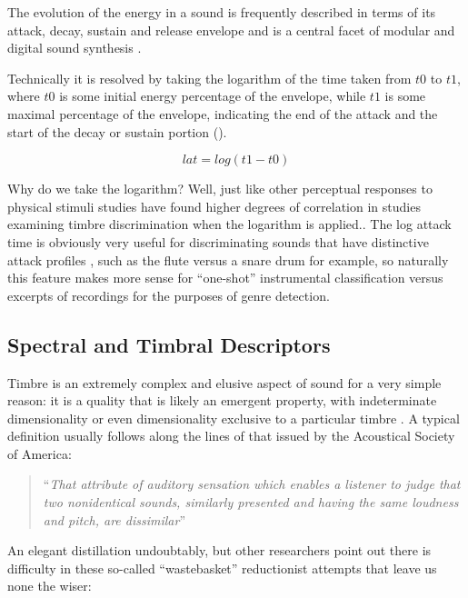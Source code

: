 {{The evolution of the energy in a sound is frequently described in terms of its attack, decay, sustain and release envelope \citep{Peeters2004b, Kim2006, Brossier2004a} and is a central facet of modular and digital sound synthesis \citep{Russ2004}. 

Technically it is resolved by taking the logarithm of the time taken from $t0$ to $t1$, where $t0$ is some initial energy percentage of the envelope, while $t1$ is some maximal percentage of the envelope, indicating the end of the attack and the start of the decay or sustain portion ().

\begin{equation}
\label{eq:lat}
lat = log(t1-t0)
\end{equation}

Why do we take the logarithm? Well, just like other perceptual responses to physical stimuli  studies have found higher degrees of correlation in studies examining timbre discrimination when the logarithm is applied.\citep{McAdams1995, McAdams1999, Agres2016}. The log attack time is obviously very useful for discriminating sounds that have distinctive attack profiles \citep{Herrera-Boyer2003}, such as the flute versus a snare drum for example, so naturally this feature makes more sense for ``one-shot'' instrumental classification versus excerpts of recordings for the purposes of genre detection.

\subsection{Spectral and Timbral Descriptors}

Timbre is an extremely complex and elusive aspect of sound for a very simple reason: it is a quality that is likely an emergent property, with indeterminate dimensionality \citep{Elliott2013, Siedenburg2017} or even dimensionality exclusive to a particular timbre \citep{Krumhansl1989}. A typical definition usually follows along the lines of that issued by the Acoustical Society of America:

\blockcquote[]{ansi}{``\textit{That attribute of auditory sensation which enables a listener to judge that two nonidentical sounds, similarly presented and having the same loudness and pitch, are dissimilar}''} 

An elegant distillation undoubtably, but other researchers point out \citep{Siedenburg2017} there is difficulty in these so-called ``wastebasket'' reductionist attempts that leave us none the wiser:

}}
